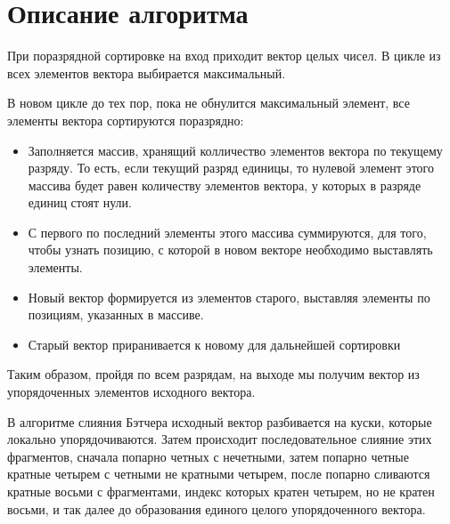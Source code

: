 \documentclass{report}
\begin{document}
	\section*{Описание алгоритма}
	При поразрядной сортировке на вход приходит вектор целых чисел. В цикле из всех элементов вектора выбирается максимальный.
	\par В новом цикле до тех пор, пока не обнулится максимальный элемент, все элементы вектора сортируются поразрядно:
	\begin{itemize}
		\item Заполняется массив, хранящий колличество элементов вектора по текущему разряду. То есть, если текущий разряд единицы, то нулевой элемент этого массива будет равен количеству элементов вектора, у которых в разряде единиц стоят нули.
		\item С первого по последний элементы этого массива суммируются, для того, чтобы узнать позицию, с которой в новом векторе необходимо выставлять элементы.
		\item Новый вектор формируется из элементов старого, выставляя элементы по позициям, указанных в массиве.
		\item Старый вектор приранивается к новому для дальнейшей сортировки
	\end{itemize}
	\par Таким образом, пройдя по всем разрядам, на выходе мы получим вектор из упорядоченных элементов исходного вектора.
	\par В алгоритме слияния Бэтчера исходный вектор разбивается на куски, которые локально упорядочиваются. Затем происходит последовательное слияние этих фрагментов, сначала попарно четных с нечетными, затем попарно четные кратные четырем с четными не кратными четырем, после попарно сливаются кратные восьми с фрагментами, индекс которых кратен четырем, но не кратен восьми, и так далее до образования единого целого упорядоченного вектора.
	\newpage
	
\end{document}
